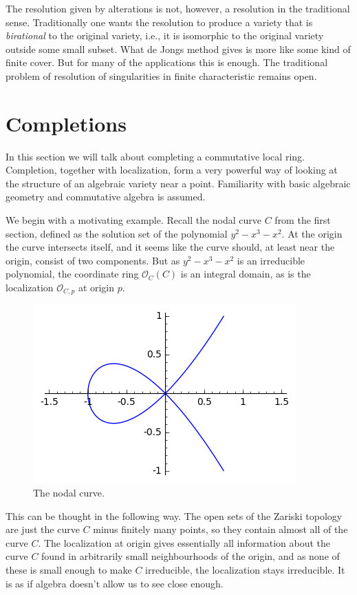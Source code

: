 \documentclass[12pt,a4paper,leqno]{article}
\newcommand{\OO}{\mathcal{O}}
\theoremstyle{plain}
\theoremstyle{definition}
\theoremstyle{remark}
\begin{document}
The resolution given by alterations is not, however, a resolution in the traditional sense. Traditionally one wants the resolution to produce a variety that is \emph{birational} to the original variety, i.e., it is isomorphic to the original variety outside some small subset. What de Jongs method gives is more like some kind of finite cover. But for many of the applications this is enough. The traditional problem of resolution of singularities in finite characteristic remains open.


\section{Completions}

In this section we will talk about completing a commutative local ring. Completion, together with localization, form a very powerful way of looking at the structure of an algebraic variety near a point. Familiarity with basic algebraic geometry and commutative algebra is assumed.

We begin with a motivating example. Recall the nodal curve $C$ from the first section, defined as the solution set of the polynomial $y^2 - x^3 - x^2$. At the origin the curve intersects itself, and it seems like the curve should, at least near the origin, consist of two components. But as $y^2 - x^3 - x^2$ is an irreducible polynomial, the coordinate ring $\OO_C (C)$ is an integral domain, as is the localization $\OO_{C,p}$ at origin $p$.

\begin{figure}\label{node2}
\begin{center}
\includegraphics{pics/node.png}
\caption{The nodal curve.}
\end{center}
\end{figure}

This can be thought in the following way. The open sets of the Zariski topology are just the curve $C$ minus finitely many points, so they contain almost all of the curve $C$. The localization at origin gives essentially all information about the curve $C$ found in arbitrarily small neighbourhoods of the origin, and as none of these is small enough to make $C$ irreducible, the localization stays irreducible. It is as if algebra doesn't allow us to see close enough.
\end{document}
